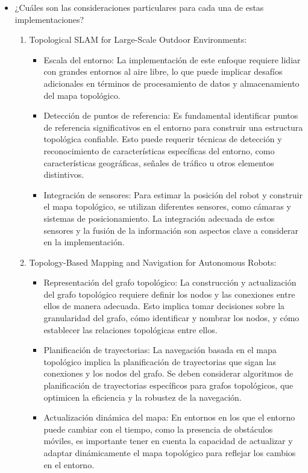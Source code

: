 \documentclass{article}
\begin{document}
\begin{itemize}
\item {¿Cuáles son las consideraciones particulares para cada una de estas implementaciones?} %

  \begin{enumerate}
  \item Topological SLAM for Large-Scale Outdoor Environments:
    \begin{itemize}
    \item Escala del entorno: La implementación de este enfoque requiere lidiar con grandes entornos al aire libre, lo que puede implicar desafíos adicionales en términos de procesamiento de datos y almacenamiento del mapa topológico.
    \item Detección de puntos de referencia: Es fundamental identificar puntos de referencia significativos en el entorno para construir una estructura topológica confiable. Esto puede requerir técnicas de detección y reconocimiento de características específicas del entorno, como características geográficas, señales de tráfico u otros elementos distintivos.
    \item Integración de sensores: Para estimar la posición del robot y construir el mapa topológico, se utilizan diferentes sensores, como cámaras y sistemas de posicionamiento. La integración adecuada de estos sensores y la fusión de la información son aspectos clave a considerar en la implementación.
    \end{itemize}
  \item Topology-Based Mapping and Navigation for Autonomous Robots:

    \begin{itemize}
    \item Representación del grafo topológico: La construcción y actualización del grafo topológico requiere definir los nodos y las conexiones entre ellos de manera adecuada. Esto implica tomar decisiones sobre la granularidad del grafo, cómo identificar y nombrar los nodos, y cómo establecer las relaciones topológicas entre ellos.
    \item Planificación de trayectorias: La navegación basada en el mapa topológico implica la planificación de trayectorias que sigan las conexiones y los nodos del grafo. Se deben considerar algoritmos de planificación de trayectorias específicos para grafos topológicos, que optimicen la eficiencia y la robustez de la navegación.
      \item Actualización dinámica del mapa: En entornos en los que el entorno puede cambiar con el tiempo, como la presencia de obstáculos móviles, es importante tener en cuenta la capacidad de actualizar y adaptar dinámicamente el mapa topológico para reflejar los cambios en el entorno.
    \end{itemize}


\end{enumerate}
\end{itemize}
\end{document}
